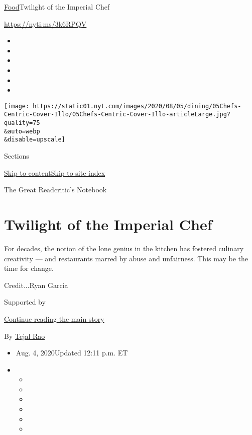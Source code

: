 \href{/section/food}{Food}\textbar{}Twilight of the Imperial Chef

\url{https://nyti.ms/3k6RPQV}

\begin{itemize}
\item
\item
\item
\item
\item
\item
\end{itemize}

\texttt{[image: https://static01.nyt.com/images/2020/08/05/dining/05Chefs-Centric-Cover-Illo/05Chefs-Centric-Cover-Illo-articleLarge.jpg?quality=75\\\&auto=webp\\\&disable=upscale]}

Sections

\protect\hyperlink{site-content}{Skip to
content}\protect\hyperlink{site-index}{Skip to site index}

The Great Readcritic's Notebook

\hypertarget{twilight-of-the-imperial-chef}{%
\section{Twilight of the Imperial
Chef}\label{twilight-of-the-imperial-chef}}

For decades, the notion of the lone genius in the kitchen has fostered
culinary creativity --- and restaurants marred by abuse and unfairness.
This may be the time for change.

Credit...Ryan Garcia

Supported by

\protect\hyperlink{after-sponsor}{Continue reading the main story}

By \href{https://www.nytimes.com/by/tejal-rao}{Tejal Rao}

\begin{itemize}
\item
  Aug. 4, 2020Updated 12:11 p.m. ET
\item
  \begin{itemize}
  \item
  \item
  \item
  \item
  \item
  \item
  \end{itemize}
\end{itemize}

